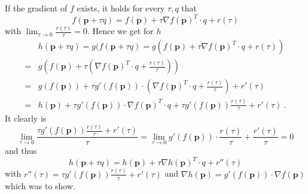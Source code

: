 \documentclass[11pt]{article} %
\begin{document}
If the gradient of $f$ exists, it holds for every $\tau, q$ that
\[
  f(\mathbf p + \tau q) = f(\mathbf p) + \tau \nabla f(\mathbf p)^T \cdot q
  + r(\tau)
\]
with $\lim_{\tau \to 0} \frac{r(\tau)}{\tau} = 0$.
Hence we get for $h$
\[
  \begin{array}{rl}
    & h(\mathbf p + \tau q) = g(f(\mathbf p+ \tau q) =
    g(f(\mathbf p) + \tau \nabla f(\mathbf p)^T \cdot q + r(\tau)) \\
    =& g(f(\mathbf p) + \tau (\nabla f(\mathbf p)^T \cdot q + \frac{r(\tau)}{\tau})) \\
    =& g(f(\mathbf p)) + \tau g'(f(\mathbf p)) \cdot (\nabla f(\mathbf p)^T
      \cdot q + \frac{r(\tau)}{\tau}) + r'(\tau) \\
    =& h(\mathbf p) + \tau g'(f(\mathbf p)) \cdot \nabla f(\mathbf p)^T
      \cdot q + \tau g'(f(\mathbf p)) \frac{r(\tau)}{\tau} + r'(\tau) \ .
  \end{array}
\]
It clearly is
\[
  \lim_{\tau \to 0} \frac{\tau g'(f(\mathbf p)) \frac{r(\tau)}{\tau} + r'(\tau)}{\tau}
  = \lim_{\tau \to 0} g'(f(\mathbf p)) \cdot \frac{r(\tau)}{\tau} + \frac{r'(\tau)}{\tau}
  = 0
\]
and thus
\[
  h(\mathbf p + \tau q) = h(\mathbf p) + \tau \nabla h(\mathbf p)^T \cdot q
  + r''(\tau)
\]
with $r''(\tau) = \tau g'(f(\mathbf p)) \frac{r(\tau)}{\tau} + r'(\tau)$
and $\nabla h(\mathbf p) = g'(f(\mathbf p)) \cdot \nabla f(\mathbf p)$
which was to show.
\end{document}
